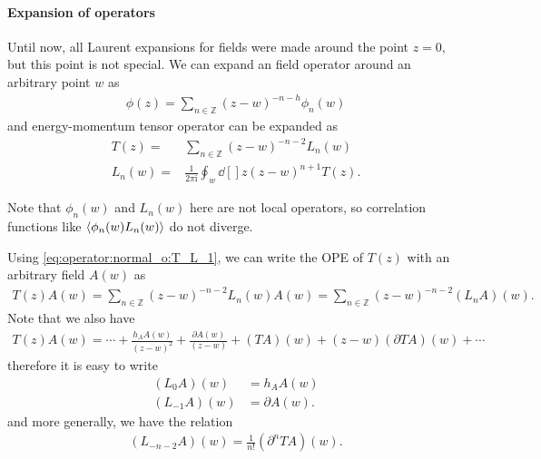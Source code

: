 \documentclass[10pt]{article}
\newcommand{\ii}{\mathrm{i}}
\begin{document}
\paragraph{Expansion of operators}
Until now, all Laurent expansions for fields were made around the point $z=0$, but this point is not special.
We can expand an field operator around an arbitrary point $w$ as
\begin{align}
    \phi(z)=\sum_{n\in\mathbb{Z}}(z-w)^{-n-h}\phi_n(w)
\end{align}
and energy-momentum tensor operator can be expanded as
\begin{subequations}
    \begin{align}
        T(z)=   & \sum_{n\in\mathbb{Z}}(z-w)^{-n-2}L_n(w)  \label{eq:operator:normal_o:T_L_1} \\
        L_n(w)= & \frac{1}{2\pi\ii}\oint_w\dd[]{z}(z-w)^{n+1}T(z).
    \end{align}
\end{subequations}
\begin{remark}
    Note that $\phi_n(w)$ and $L_n(w)$ here are not local operators, so correlation functions like $\expval{\phi_n(w)L_n(w)}$ do not diverge.
\end{remark}


Using \cref{eq:operator:normal_o:T_L_1}, we can write the OPE of $T(z)$ with an arbitrary field $A(w)$ as 
\begin{align}
    T(z)A(w)=\sum_{n\in\mathbb{Z}}(z-w)^{-n-2}L_n(w)A(w)=\sum_{n\in\mathbb{Z}}(z-w)^{-n-2}(L_n A)(w).\label{eq:operator:normal_o:T_A_L_A}
\end{align}
Note that we also have
\begin{align}
    T(z)A(w)=\cdots+\frac{h_A A(w)}{(z-w)^2}+\frac{\partial A(w)}{(z-w)}+(TA)(w)+(z-w)(\partial TA)(w)+\cdots
\end{align}
therefore it is easy to write 
\begin{subequations}
    \begin{align}
        (L_0 A)(w)   & =h_A A(w)       \\
        (L_{-1}A)(w) & =\partial A(w).
    \end{align}
\end{subequations}
and more generally, we have the relation 
\begin{align}
    (L_{-n-2}A)(w)=\frac{1}{n!}(\partial^n TA)(w).
\end{align}
\end{document}

